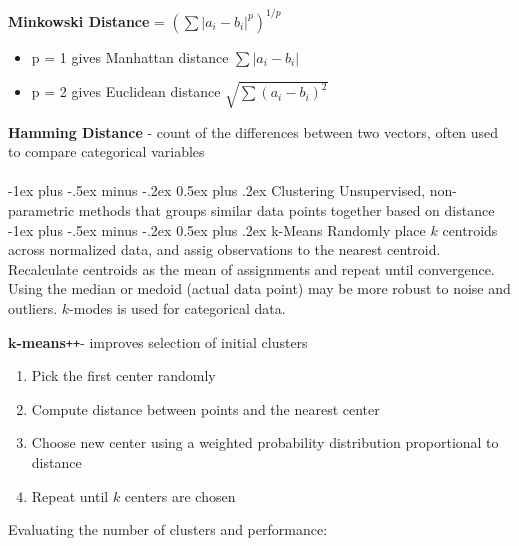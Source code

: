 \documentclass[10pt,landscape]{article}
\makeatletter
\renewcommand{\section}{\@startsection{section}{1}{0mm}%
                                {-1ex plus -.5ex minus -.2ex}%
                                {0.5ex plus .2ex}%
                                {\normalfont\large\bfseries}}
\renewcommand{\subsection}{\@startsection{subsection}{2}{0mm}%
                                {-1ex plus -.5ex minus -.2ex}%
                                {0.5ex plus .2ex}%
                                {\normalfont\normalsize\bfseries}}
\makeatother
\begin{document}
\begin{multicols}{3}
    \textbf{Minkowski Distance} = $(\sum|a_i - b_i|^p)^{1/p}$
    \begin{itemize}[label={--},leftmargin=4mm]
        \itemsep -.4mm
        \item p = 1 gives Manhattan distance ${\sum|a_i - b_i|}$
        \item p = 2 gives Euclidean distance $\sqrt{\sum(a_i - b_i)^2}$
    \end{itemize}

    \textbf{Hamming Distance} - count of the differences between two vectors, often used to compare categorical variables \\

    \columnbreak
    \textcolor{white}{.}\vspace{-5mm}\\ %
    \section{Clustering}
    Unsupervised, non-parametric methods that groups similar data points together based on distance
    \subsection{k-Means}
    Randomly place $k$ centroids across normalized data, and assig observations to the nearest centroid. Recalculate centroids as the mean of assignments and repeat until convergence. Using the median or medoid (actual data point) may be more robust to noise and outliers. $k$-modes is used for categorical data.

    \def\Plus{\texttt{+}}
    $\boldsymbol{k}$\textbf{-means}\Plus\Plus\hspace{1mm}- improves selection of initial clusters
    \begin{enumerate}[leftmargin=5mm]
        \itemsep -.4mm
        \item Pick the first center randomly
        \item Compute distance between points and the nearest center
        \item Choose new center using a weighted probability distribution proportional to distance
        \item Repeat until $k$ centers are chosen
    \end{enumerate}

    Evaluating the number of clusters and performance:


\end{multicols}
\end{document}
